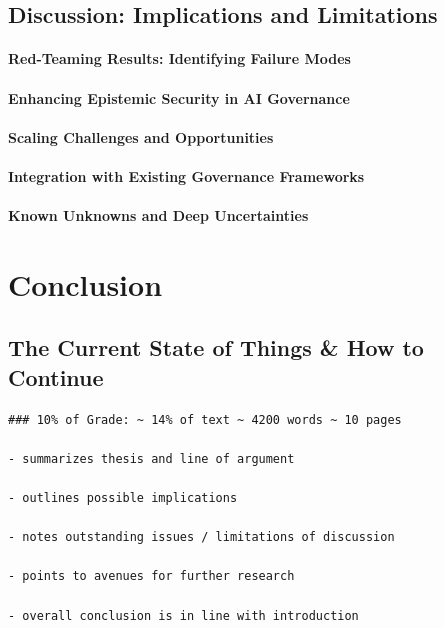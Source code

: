 \documentclass[
  letterpaper,
]{book}
\begin{document}
\section{Discussion: Implications and
Limitations}\label{discussion-implications-and-limitations}

\subsubsection{Red-Teaming Results: Identifying Failure
Modes}\label{red-teaming-results-identifying-failure-modes}

\subsubsection{Enhancing Epistemic Security in AI
Governance}\label{enhancing-epistemic-security-in-ai-governance}

\subsubsection{Scaling Challenges and
Opportunities}\label{scaling-challenges-and-opportunities}

\subsubsection{Integration with Existing Governance
Frameworks}\label{integration-with-existing-governance-frameworks}

\subsubsection{Known Unknowns and Deep
Uncertainties}\label{known-unknowns-and-deep-uncertainties}


\chapter{Conclusion}\label{conclusion}

\section{The Current State of Things \& How to
Continue}\label{the-current-state-of-things-how-to-continue}

\begin{verbatim}
### 10% of Grade: ~ 14% of text ~ 4200 words ~ 10 pages

- summarizes thesis and line of argument

- outlines possible implications

- notes outstanding issues / limitations of discussion

- points to avenues for further research

- overall conclusion is in line with introduction
\end{verbatim}
\end{document}
